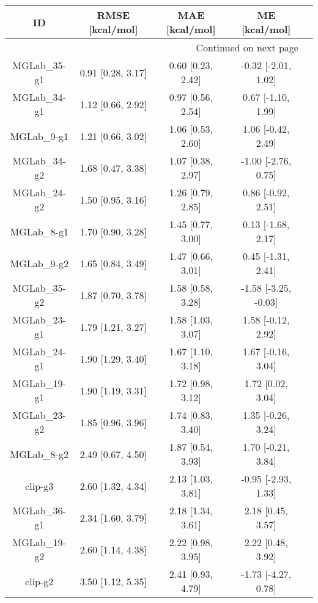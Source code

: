 \documentclass[8pt]{article}
\begin{document}
\begin{center}
\begin{footnotesize}
\begin{longtable}{|ccccc|}
\toprule
           ID &     RMSE [kcal/mol] &     MAE [kcal/mol] &         ME [kcal/mol] \\
\midrule
\endhead
\midrule
\multicolumn{4}{r}{{Continued on next page}} \\
\midrule
\endfoot

\bottomrule
\endlastfoot
 MGLab\_35-g1 &   0.91 [0.28, 3.17] &  0.60 [0.23, 2.42] &   -0.32 [-2.01, 1.02] \\
 MGLab\_34-g1 &   1.12 [0.66, 2.92] &  0.97 [0.56, 2.54] &    0.67 [-1.10, 1.99] \\
  MGLab\_9-g1 &   1.21 [0.66, 3.02] &  1.06 [0.53, 2.60] &    1.06 [-0.42, 2.49] \\
 MGLab\_34-g2 &   1.68 [0.47, 3.38] &  1.07 [0.38, 2.97] &   -1.00 [-2.76, 0.75] \\
 MGLab\_24-g2 &   1.50 [0.95, 3.16] &  1.26 [0.79, 2.85] &    0.86 [-0.92, 2.51] \\
  MGLab\_8-g1 &   1.70 [0.90, 3.28] &  1.45 [0.77, 3.00] &    0.13 [-1.68, 2.17] \\
  MGLab\_9-g2 &   1.65 [0.84, 3.49] &  1.47 [0.66, 3.01] &    0.45 [-1.31, 2.41] \\
 MGLab\_35-g2 &   1.87 [0.70, 3.78] &  1.58 [0.58, 3.28] &  -1.58 [-3.25, -0.03] \\
 MGLab\_23-g1 &   1.79 [1.21, 3.27] &  1.58 [1.03, 3.07] &    1.58 [-0.12, 2.92] \\
 MGLab\_24-g1 &   1.90 [1.29, 3.40] &  1.67 [1.10, 3.18] &    1.67 [-0.16, 3.04] \\
 MGLab\_19-g1 &   1.90 [1.19, 3.31] &  1.72 [0.98, 3.12] &     1.72 [0.02, 3.04] \\
 MGLab\_23-g2 &   1.85 [0.96, 3.96] &  1.74 [0.83, 3.40] &    1.35 [-0.26, 3.24] \\
  MGLab\_8-g2 &   2.49 [0.67, 4.50] &  1.87 [0.54, 3.93] &    1.70 [-0.21, 3.84] \\
      clip-g3 &   2.60 [1.32, 4.34] &  2.13 [1.03, 3.81] &   -0.95 [-2.93, 1.33] \\
 MGLab\_36-g1 &   2.34 [1.60, 3.79] &  2.18 [1.34, 3.61] &     2.18 [0.45, 3.57] \\
 MGLab\_19-g2 &   2.60 [1.14, 4.38] &  2.22 [0.98, 3.95] &     2.22 [0.48, 3.92] \\
      clip-g2 &   3.50 [1.12, 5.35] &  2.41 [0.93, 4.79] &   -1.73 [-4.27, 0.78] \\

\end{longtable}
\end{footnotesize}
\end{center}
\end{document}
